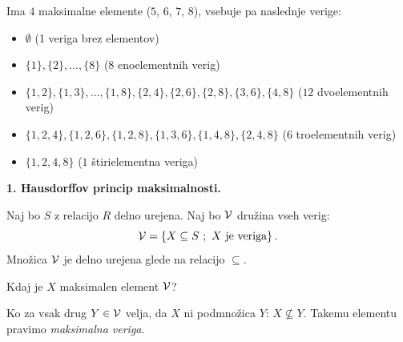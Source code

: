 \documentclass[11pt,paper=b5,footinclude,headinclude]{scrbook} %
\begin{document}
Ima $4$ maksimalne elemente ($5$, $6$, $7$, $8$), vsebuje pa naslednje verige:
\begin{itemize}
  \item $\emptyset$ (1 veriga brez elementov)
  \item $\{1\}, \{2\}, \ldots, \{8\}$  ($8$ enoelementnih verig)
  \item $\{1,2\}, \{1,3\},\ldots, \{1,8\},\{2,4\}, \{2,6\}, \{2,8\}, \{3,6\}, \{4,8\}$  ($12$ dvoelementnih verig)
  \item $\{1,2,4\}, \{1,2,6\}, \{1,2,8\},\{1,3,6\},\{1,4,8\}, \{2,4,8\}$  ($6$ troelementnih verig)
  \item $\{1,2,4,8\}$  ($1$ štirielementna veriga)
\end{itemize}

%
%
%
%

\bigskip
\textbf{1. Hausdorffov princip maksimalnosti.}

Naj bo $S$ z relacijo $R$ delno urejena. Naj bo ${\cal V}$ družina vseh verig:
$${\cal V} = \{X\subseteq S~;~X \textrm { je veriga}\}\,.$$
Množica ${\cal V}$ je delno urejena glede na relacijo $\subseteq$.

Kdaj je $X$ maksimalen element ${\cal V}$?

Ko za vsak drug $Y\in {\cal V}$ velja, da $X$ ni podmnožica $Y$: $X\nsubseteq Y$.
Takemu elementu pravimo {\em maksimalna veriga}.
\end{document}
